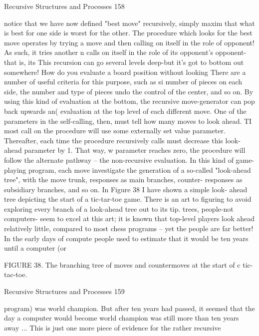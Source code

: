 Recursive Structures and Processes                                                    158

notice that we have now defined "best move" recursively, simply maxim that what is best
for one side is worst for the other. The procedure which looks for the best move operates
by trying a move and then calling on itself in the role of opponent! As such, it tries
another n calls on itself in the role of its opponent's opponent-that is, its
         This recursion can go several levels deep-but it's got to bottom out somewhere!
How do you evaluate a board position without looking There are a number of useful
criteria for this purpose, such as si number of pieces on each side, the number and type of
pieces undo the control of the center, and so on. By using this kind of evaluation at the
bottom, the recursive move-generator can pop back upwards an( evaluation at the top
level of each different move. One of the parameters in the self-calling, then, must tell
how many moves to look ahead. TI most call on the procedure will use some externally
set value parameter. Thereafter, each time the procedure recursively calls must decrease
this look-ahead parameter by 1. That way, w parameter reaches zero, the procedure will
follow the alternate pathway -- the non-recursive evaluation.
         In this kind of game-playing program, each move investigate the generation of a
so-called "look-ahead tree", with the move trunk, responses as main branches, counter-
responses as subsidiary branches, and so on. In Figure 38 I have shown a simple look-
ahead tree depicting the start of a tic-tar-toe game. There is an art to figuring to avoid
exploring every branch of a look-ahead tree out to its tip. trees, people-not computers-
seem to excel at this art; it is known that top-level players look ahead relatively little,
compared to most chess programs – yet the people are far better! In the early days of
compute people used to estimate that it would be ten years until a computer (or

FIGURE 38. The branching tree of moves and countermoves at the start of c tic-tac-toe.




Recursive Structures and Processes                                                     159

 program) was world champion. But after ten years had passed, it seemed that the day a
 computer would become world champion was still more than ten years away ... This is
               just one more piece of evidence for the rather recursive

